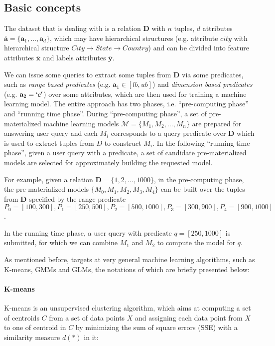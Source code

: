 \subsection{Basic concepts}
The dataset that \cite{hasani2018efficient} is dealing with is a relation $\textbf{D}$ with $n$ tuples, $d$ attributes $\bar{\textbf{a}} = \{\textbf{a}_1, \dots, \textbf{a}_d\}$, which may have hierarchical structures (e.g. attribute $city$ with hierarchical structure $City \rightarrow State \rightarrow Country$) and can be divided into feature attributes $\bar{\textbf{x}}$ and labels attributes $\bar{\textbf{y}}$.

We can issue some queries to extract some tuples from $\textbf{D}$ via some predicates, such as {\em range based predicates} (e.g. $\textbf{a}_1 \in [lb, ub]$) and {\em dimension based predicates} (e.g. $\textbf{a}_2 = `c'$) over some attributes, which are then used for training a machine learning model. The entire approach has two phases, i.e. ``pre-computing phase'' and ``running time phase''. During ``pre-computing phase'', a set of pre-materialized machine learning models $\mathcal{M} = \{M_1, M_2, \dots, M_n\}$ are prepared for answering user query and each $M_i$ corresponds to a query predicate over $\textbf{D}$ which is used to extract tuples from $D$ to construct $M_i$. In the following ``running time phase'', given a user query with a predicate, a set of candidate pre-materialized models are selected for approximately building the requested model.

\begin{example}\label{eg: two_phase_eg}
For example, given a relation $\textbf{D}=\{1,2,\dots, 1000\}$, in the pre-computing phase, the pre-materialized models $\{M_0, M_1, M_2, M_3, M_4\}$ can be built over the tuples from $\textbf{D}$ specified by the range predicate $P_0 = [100, 300], P_1 = [250, 500], P_2 = [500, 1000], P_3 = [300, 900], P_4 = [900, 1000]$. 

In the running time phase, a user query with predicate $q=[250, 1000]$ is submitted, for which we can combine $M_1$ and $M_2$ to compute the model for $q$.
\end{example}

As mentioned before, \cite{hasani2018efficient} targets at very general machine learning algorithms, such as K-means, GMMs and GLMs, the notations of which are briefly presented below:

\paragraph{K-means} K-means is an unsupervised clustering algorithm, which aims at computing a set of centroids $C$ from a set of data points $X$ and assigning each data point from $X$ to one of centroid in $C$ by minimizing the sum of square errors (SSE) with a similarity measure $d(*)$ in it:

